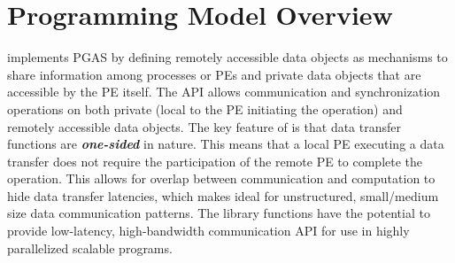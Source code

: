 \section{Programming Model Overview}
\openshmem implements \ac{PGAS} by defining remotely accessible data objects as mechanisms to share information among \openshmem processes or \acp{PE} and private data objects that are accessible by the \ac{PE} itself. The \ac{API} allows communication and synchronization operations on both private (local to the PE initiating the operation) and remotely accessible data objects. The key feature of \openshmem is that data transfer functions are \textit{\textbf{one-sided}} in nature. This means that a local \ac{PE} executing a data transfer does not require the participation of the remote \ac{PE} to complete the operation. This allows for overlap between communication and computation to hide data transfer latencies, which makes  \openshmem ideal for unstructured, small/medium size data communication patterns. The \openshmem library functions have the potential to provide low-latency, high-bandwidth communication \ac{API} for use in highly parallelized scalable programs.  


